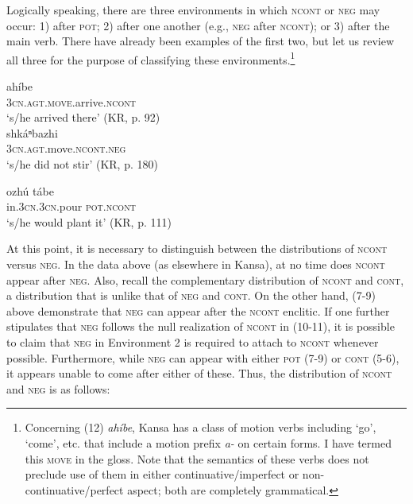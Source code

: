 \documentclass[output=paper]{LSP/langsci}
\begin{document}
Logically speaking, there are three environments in which \textsc{ncont} or \textsc{neg} may occur: 1) after \textsc{pot}; 2) after one another (e.g., \textsc{neg} after \textsc{ncont}); or 3) after the main verb. There have already been examples of the first two, but let us review all three for the purpose of classifying these environments.\footnote{Concerning (12) \textit{ahíbe}, Kansa has a class of motion verbs including `go', `come', etc. that include a motion prefix \textit{a-} on certain forms. I have termed this \textsc{move} in the gloss. Note that the semantics of these verbs does not preclude use of them in either continuative/imperfect or non-continuative/perfect aspect; both are completely grammatical.}

\ea
  \ea 
 
  \gll ahíbe  \\
  \textsc{3cn.agt.move}.arrive.\textsc{ncont}  \\
  \glt `s/he arrived there' (KR, p. 92)   \\

  \ex 
  \gll shkáⁿbazhi   ~\,\, \\
  \textsc{3cn.agt}.move.\textsc{ncont.neg}   \\
  \glt `s/he did not stir' (KR, p. 180)    

  \ex
  \gll ozhú	tábe	  \\
  in.\textsc{3cn.3cn}.pour \textsc{pot.ncont}\,   \\
  \glt `s/he would plant it' (KR, p. 111)    
  \z 
\z 

\vspace{1em}
At this point, it is necessary to distinguish between the distributions of \textsc{ncont} versus \textsc{neg}. In the data above (as elsewhere in Kansa), at no time does \textsc{ncont} appear after \textsc{neg}. Also, recall the complementary distribution of \textsc{ncont} and \textsc{cont}, a distribution that is unlike that of \textsc{neg} and \textsc{cont}. On the other hand, (7-9) above demonstrate that \textsc{neg} can appear after the \textsc{ncont} enclitic. If one further stipulates that \textsc{neg} follows the null realization of \textsc{ncont} in (10-11), it is possible to claim that \textsc{neg} in Environment 2 is required to attach to \textsc{ncont} whenever possible. Furthermore, while \textsc{neg} can appear with either \textsc{pot} (7-9) or \textsc{cont} (5-6), it appears unable to come after either of these. Thus, the distribution of \textsc{ncont} and \textsc{neg} is as follows:
\end{document}
